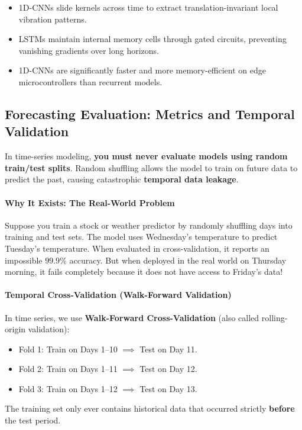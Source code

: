 \begin{takeaways}
\begin{itemize}
    \item 1D-CNNs slide kernels across time to extract translation-invariant local vibration patterns.
    \item LSTMs maintain internal memory cells through gated circuits, preventing vanishing gradients over long horizons.
    \item 1D-CNNs are significantly faster and more memory-efficient on edge microcontrollers than recurrent models.
\end{itemize}
\end{takeaways}

\subsection{Forecasting Evaluation: Metrics and Temporal Validation}

\begin{keyidea}
In time-series modeling, \textbf{you must never evaluate models using random train/test splits}. Random shuffling allows the model to train on future data to predict the past, causing catastrophic \textbf{temporal data leakage}.
\end{keyidea}

\paragraph{Why It Exists: The Real-World Problem}
Suppose you train a stock or weather predictor by randomly shuffling days into training and test sets. The model uses Wednesday's temperature to predict Tuesday's temperature. When evaluated in cross-validation, it reports an impossible $99.9\%$ accuracy. But when deployed in the real world on Thursday morning, it fails completely because it does not have access to Friday's data!

\paragraph{Temporal Cross-Validation (Walk-Forward Validation)}
In time series, we use \textbf{Walk-Forward Cross-Validation} (also called rolling-origin validation):
\begin{itemize}
    \item Fold 1: Train on Days 1--10 $\implies$ Test on Day 11.
    \item Fold 2: Train on Days 1--11 $\implies$ Test on Day 12.
    \item Fold 3: Train on Days 1--12 $\implies$ Test on Day 13.
\end{itemize}
The training set only ever contains historical data that occurred strictly \textbf{before} the test period.

